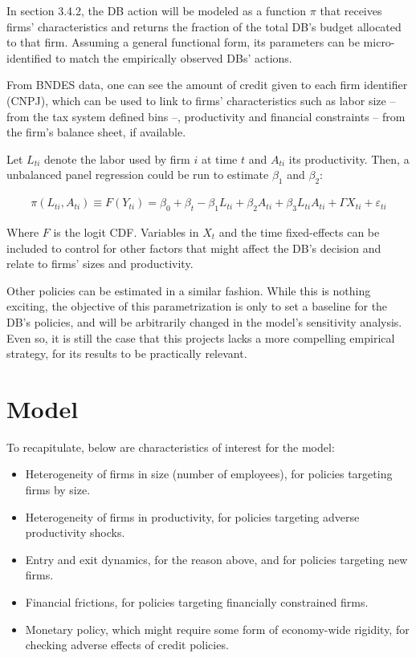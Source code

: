 \documentclass[12pt]{article}
\begin{document}
In section 3.4.2, the DB action will be modeled as a function $\pi$ that receives firms' characteristics and returns the fraction of the total DB's budget allocated to that firm. Assuming a general functional form, its parameters can be micro-identified to match the empirically observed DBs' actions.

From BNDES data, one can see the amount of credit given to each firm identifier (CNPJ), which can be used to link to firms' characteristics such as labor size -- from the tax system defined bins --, productivity and financial constraints -- from the firm's balance sheet, if available.

Let $L_{ti}$ denote the labor used by firm $i$ at time $t$ and $A_{ti}$ its productivity. Then, a unbalanced panel regression could be run to estimate $\beta_1$ and $\beta_2$:

\begin{align*}
    \pi(L_{ti}, A_{ti}) \equiv F(Y_{ti}) = \beta_0 + \beta_t - \beta_1 L_{ti} + \beta_2 A_{ti} + \beta_3 L_{ti}A_{ti} + \Gamma X_{ti} + \varepsilon_{ti}
\end{align*}

Where $F$ is the logit CDF. Variables in $X_t$ and the time fixed-effects can be included to control for other factors that might affect the DB's decision and relate to firms' sizes and productivity.

Other policies can be estimated in a similar fashion. While this is nothing exciting, the objective of this parametrization is only to set a baseline for the DB's policies, and will be arbitrarily changed in the model's sensitivity analysis. Even so, it is still the case that this projects lacks a more compelling empirical strategy, for its results to be practically relevant.



\section{Model}

To recapitulate, below are characteristics of interest for the model:

\begin{itemize}
    \item Heterogeneity of firms in size (number of employees), for policies targeting firms by size.
    \item Heterogeneity of firms in productivity, for policies targeting adverse productivity shocks.
    \item Entry and exit dynamics, for the reason above, and for policies targeting new firms.
    \item Financial frictions, for policies targeting financially constrained firms.
    \item Monetary policy, which might require some form of economy-wide rigidity, for checking adverse effects of credit policies.
\end{itemize}
\end{document}
